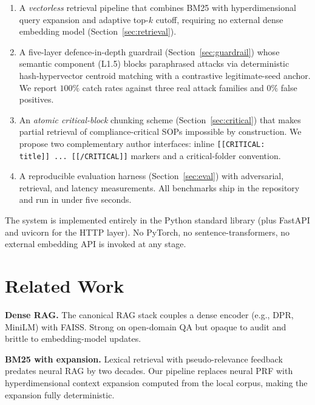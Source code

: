 \documentclass[conference]{IEEEtran}
\begin{document}
\begin{enumerate}
  \item A \emph{vectorless} retrieval pipeline that combines BM25
        with hyperdimensional query expansion and adaptive top-$k$
        cutoff, requiring no external dense embedding model
        (Section~\ref{sec:retrieval}).
  \item A five-layer defence-in-depth guardrail
        (Section~\ref{sec:guardrail}) whose semantic component
        (L1.5) blocks paraphrased attacks via deterministic
        hash-hypervector centroid matching with a contrastive
        legitimate-seed anchor.  We report $100\%$ catch rates
        against three real attack families and $0\%$ false
        positives.
  \item An \emph{atomic critical-block} chunking scheme
        (Section~\ref{sec:critical}) that makes partial retrieval of
        compliance-critical SOPs impossible by construction.  We
        propose two complementary author interfaces: inline
        \texttt{[[CRITICAL:\,title]]\,...\,[[/CRITICAL]]} markers and
        a critical-folder convention.
  \item A reproducible evaluation harness
        (Section~\ref{sec:eval}) with adversarial, retrieval, and
        latency measurements.  All benchmarks ship in the repository
        and run in under five seconds.
\end{enumerate}

The system is implemented entirely in the Python standard library
(plus FastAPI and uvicorn for the HTTP layer).  No PyTorch, no
sentence-transformers, no external embedding API is invoked at any
stage.

\section{Related Work}

\textbf{Dense RAG.}  The canonical RAG stack
\cite{lewis2020rag} couples a dense encoder
(e.g., DPR, MiniLM) with FAISS.  Strong on open-domain QA but opaque
to audit and brittle to embedding-model updates.

\textbf{BM25 with expansion.}  Lexical retrieval with pseudo-relevance
feedback \cite{lavrenko2001prf} predates neural RAG by two decades.
Our pipeline replaces neural PRF with hyperdimensional context
expansion \cite{kanerva2009hyperdimensional} computed from the local
corpus, making the expansion fully deterministic.
\end{document}
